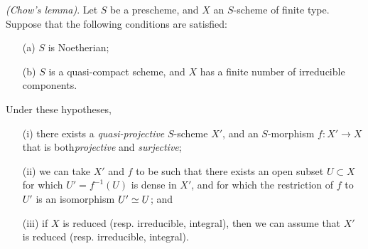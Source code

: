 \begin{theorem}[5.6.1]
\label{II.5.6.1}
\emph{(Chow's lemma)}.
Let $S$ be a prescheme, and $X$ an $S$-scheme of finite type.
Suppose that the following conditions are satisfied:
\begin{enumerate}
  \item[{\rm(a)}] $S$ is Noetherian;
  \item[{\rm(b)}] $S$ is a quasi-compact scheme, and $X$ has a finite number of irreducible components.
\end{enumerate}
Under these hypotheses,
\begin{enumerate}
  \item[{\rm(i)}] there exists a \emph{quasi-projective} $S$-scheme $X'$, and an $S$-morphism $f:X'\to X$ that is both\emph{projective} and \emph{surjective};
  \item[{\rm(ii)}] we can take $X'$ and $f$ to be such that there exists an open subset $U\subset X$ for which $U'=f^{-1}(U)$ is dense in $X'$, and for which the restriction of $f$ to $U'$ is an isomorphism $U'\simeq U$; and
  \item[{\rm(iii)}] if $X$ is reduced (resp. irreducible, integral), then we can assume that $X'$ is reduced (resp. irreducible, integral).
\end{enumerate}
\end{theorem}

